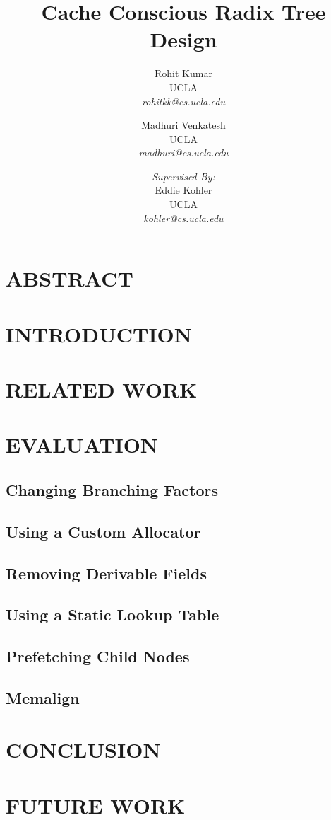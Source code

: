 \documentclass{article}
\begin{document}
\author {
  Rohit Kumar 
  \\ UCLA 
  \\ \textsl{rohitkk@cs.ucla.edu}
  \and
  Madhuri Venkatesh 
  \\ UCLA 
  \\ \textsl{madhuri@cs.ucla.edu}
  \and
  \textsl{Supervised By:}
  \\Eddie Kohler 
  \\ UCLA 
  \\ \textsl{kohler@cs.ucla.edu}
}
\title{Cache Conscious Radix Tree Design}
\maketitle
\section{ABSTRACT}
\section{INTRODUCTION}
\section{RELATED WORK}
\section{EVALUATION}

\subsection{Changing Branching Factors}
\subsection{Using a Custom Allocator}
\subsection{Removing Derivable Fields}
\subsection{Using a Static Lookup Table}
\subsection{Prefetching Child Nodes}
\subsection{Memalign}

\section{CONCLUSION}
\section{FUTURE WORK}
\end{document}
